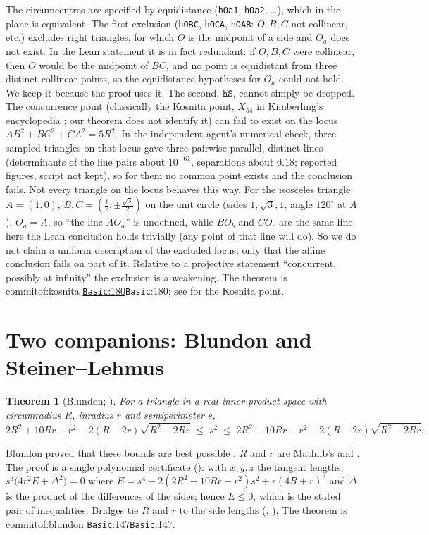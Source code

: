 \documentclass[11pt]{article}
\newtheorem{theorem}{Theorem}
\theoremstyle{definition}
\theoremstyle{remark}
\newcommand{\lean}[1]{\texttt{#1}}
\newcommand{\commitof}[1]{\csname commitof:#1\endcsname}
\newcommand{\repo}[1]{https://github.com/jpbald93/#1}
\newcommand{\src}[4]{\ifcsname commitof:#1\endcsname
  \href{\repo{#1}/blob/\commitof{#1}/#2/#3.lean\#L#4}{\texttt{#3}:#4}\else\texttt{#3}:#4\fi}
\begin{document}
The circumcentres are specified by equidistance (\lean{hOa1}, \lean{hOa2}, \ldots), which in the
plane is equivalent. The first exclusion (\lean{hOBC}, \lean{hOCA}, \lean{hOAB}: $O,B,C$ not collinear, etc.) excludes
right triangles, for which $O$ is the midpoint of a side and $O_a$ does not exist. In the Lean
statement it is in fact redundant: if $O,B,C$ were collinear, then $O$ would be the midpoint of $BC$, and
no point is equidistant from three distinct collinear points, so the equidistance hypotheses for $O_a$
could not hold. We keep it because the proof uses it. The second, $\lean{hS}$, cannot simply be
dropped. The concurrence point (classically the Kosnita point, $X_{54}$ in Kimberling's encyclopedia
\cite{etc}; our theorem does not identify it) can fail to exist on the locus $AB^2+BC^2+CA^2=5R^2$.
In the independent agent's numerical check, three sampled triangles on that locus
gave three pairwise parallel, distinct lines (determinants of the line pairs about $10^{-61}$,
separations about $0.18$; reported figures, script not kept), so for them no common point exists and
the conclusion fails. Not every triangle on the locus behaves this way. For the isosceles triangle $A=(1,0)$, $B,C=(\tfrac12,\pm\tfrac{\sqrt3}2)$ on the unit circle
(sides $1,\sqrt3,1$, angle $120^\circ$ at $A$), $O_a=A$, so ``the line $AO_a$'' is undefined, while $BO_b$ and $CO_c$ are the same line; here the Lean conclusion holds trivially (any point
of that line will do). So we do not claim a uniform description of the excluded locus; only that the
affine conclusion fails on part of it. Relative to a projective statement ``concurrent, possibly at infinity'' the exclusion is a
weakening. The
theorem is \src{kosnita}{Kosnita}{Basic}{180}; see \cite{grinberg2003} for the Kosnita point.

\section{Two companions: Blundon and Steiner--Lehmus}\label{sec:companions}

\begin{theorem}[Blundon; ]\label{thm:blundon}
For a triangle in a real inner product space with circumradius $R$, inradius $r$ and semiperimeter $s$,
\[
2R^2+10Rr-r^2-2(R-2r)\sqrt{R^2-2Rr}\;\le\; s^2\;\le\;2R^2+10Rr-r^2+2(R-2r)\sqrt{R^2-2Rr}.
\]
\end{theorem}
Blundon proved that these bounds are best possible \cite{blundon1965}. $R$ and $r$ are Mathlib's
 and . The proof is a single
polynomial certificate (): with $x,y,z$ the tangent lengths,
$s^3\bigl(4r^2E+\Delta^2\bigr)=0$ where $E=s^4-2(2R^2+10Rr-r^2)s^2+r(4R+r)^3$ and $\Delta$ is the product
of the differences of the sides; hence $E\le 0$, which is the stated pair of inequalities. Bridges tie
$R$ and $r$ to the side lengths (, ).
The theorem is \src{blundon}{Blundon}{Basic}{147}.
\end{document}

